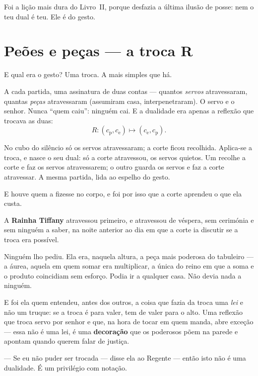 \documentclass[livro.tex]{subfiles}
\begin{document}
\medskip

Foi a lição mais dura do Livro~II, porque desfazia a última ilusão de posse: nem o
teu dual é teu. Ele é do gesto.

\chapter{Peões e peças --- a troca R}

E qual era o gesto? Uma troca. A mais simples que há.

A cada partida, uma assinatura de duas contas
--- quantos \emph{servos} atravessaram, quantas \emph{peças} atravessaram (assumiram
casa, interpenetraram). O servo e o senhor. Nunca ``quem caiu'': ninguém cai. E a
dualidade era apenas a reflexão que trocava as duas:
\[ R:(c_{\mathrm p},c_{\mathrm e})\longmapsto(c_{\mathrm e},c_{\mathrm p}). \]

\medskip

No cubo do silêncio só os servos atravessaram; a corte ficou recolhida.
Aplica-se a troca, e nasce o seu dual: só a corte atravessou, os servos
quietos. Um recolhe a corte e faz os servos atravessarem; o outro guarda os servos e
faz a corte atravessar. A mesma partida, lida ao espelho do gesto.

\medskip

E houve quem a fizesse no corpo, e foi por isso que a corte aprendeu o que ela custa.

\medskip

A \textbf{Rainha Tiffany} atravessou primeiro, e atravessou de véspera, sem cerimónia e sem
ninguém a saber, na noite anterior ao dia em que a corte ia discutir se a troca era
possível.

Ninguém lho pediu. Ela era, naquela altura, a peça mais poderosa do tabuleiro --- a áurea,
aquela em quem somar era multiplicar, a única do reino em que a soma e o produto
coincidiam sem esforço. Podia ir a qualquer casa. Não devia nada a ninguém.

E foi ela quem entendeu, antes dos outros, a coisa que fazia da troca uma \emph{lei} e não
um truque: se a troca é para valer, tem de valer para o alto. Uma reflexão que troca servo por
senhor e que, na hora de tocar em quem manda, abre exceção --- essa não é uma lei, é uma
\textbf{decoração} que os poderosos põem na parede e apontam quando querem falar de
justiça.

--- Se eu não puder ser trocada --- disse ela ao Regente --- então isto não é uma
dualidade. É um privilégio com notação.
\end{document}
